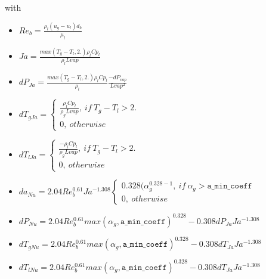 with 
\begin{itemize}
    \item[\small \textcolor{blue}{\ding{109}}]$Re_b = \frac{\rho_l (u_g-u_l)d_b}{\mu_l}$
    \item[\small \textcolor{blue}{\ding{109}}]$Ja=\frac{max(T_g-T_l,2.)\rho_l Cp_l}{\rho_lLvap}$
    \item[\small \textcolor{blue}{\ding{109}}]$dP_{Ja}=\frac{max(T_g-T_l,2.)\rho_l Cp_l}{\rho_l}\frac{-dP_{vap}}{Lvap^2}$
    \item[\small \textcolor{blue}{\ding{109}}]$dT_{gJa}=\begin{cases}\frac{\rho_lCp_l}{\rho_gLvap},\ if\ T_g-T_l> 2.\\ 0,\ otherwise
    \end{cases}$
    \item[\small \textcolor{blue}{\ding{109}}]$dT_{lJa}=\begin{cases}\frac{-\rho_lCp_l}{\rho_gLvap},\ if\ T_g-T_l> 2.\\ 0,\ otherwise\end{cases}$
    \item[\small \textcolor{blue}{\ding{109}}]$da_{Nu}  = 2.04 Re_b^{0.61}Ja^{-1.308}\begin{cases} 0.328(\alpha_g^{0.328-1},\ if\ \alpha_g > \texttt{a\_min\_coeff}\\ 0,\ otherwise  \end{cases}$
    \item[\small \textcolor{blue}{\ding{109}}]$dP_{Nu}  = 2.04Re_b^{0.61} max(\alpha_g, \texttt{a\_min\_coeff})^{0.328} -0.308dP_{Ja} Ja^{-1.308}$
    \item[\small \textcolor{blue}{\ding{109}}]$dT_{gNu}=2.04Re_b^{0.61} max(\alpha_g, \texttt{a\_min\_coeff})^{0.328} -0.308dT_{Ja} Ja^{-1.308}$
    \item[\small \textcolor{blue}{\ding{109}}]$dT_{lNu}=2.04Re_b^{0.61} max(\alpha_g, \texttt{a\_min\_coeff})^{0.328} -0.308dT_{Ja} Ja^{-1.308}$
\end{itemize}


